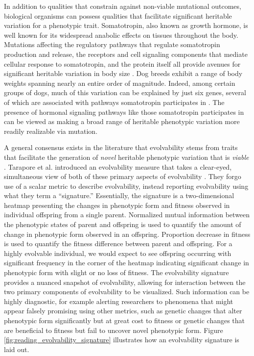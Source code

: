 In addition to qualities that constrain against non-viable mutational outcomes, biological organisms can possess qualities that facilitate significant heritable variation for a phenotypic trait.
Somatotropin, also known as growth hormone, is well known for its widespread anabolic effects on tissues throughout the body.
Mutations affecting the regulatory pathways that regulate somatotropin production and release, the receptors and cell signaling components that mediate cellular response to somatotropin, and the protein itself all provide avenues for significant heritable variation in body size \cite{devesa2016multiple}.
Dog breeds exhibit a range of body weights spanning nearly an entire order of magnitude.
Indeed, among certain groups of dogs, much of this variation can be explained by just six genes, several of which are associated with pathways somatotropin participates in \cite{rimbault2013derived}.
The presence of hormonal signaling pathways like those somatotropin participates in can be viewed as making a broad range of heritable phenotypic variation more readily realizable via mutation.

A general consensus exists in the literature that evolvability stems from traits that facilitate the generation of \textit{novel} heritable phenotypic variation that is \textit{viable} \cite{tarapore2015evolvability}.
Tarapore et al. introduced an evolvability measure that takes a clear-eyed, simultaneous view of both of these primary aspects of evolvability \cite{tarapore2015evolvability}.
They forgo use of a scalar metric to describe evolvability, instead reporting evolvability using what they term a ``signature.''
Essentially, the signature is a two-dimensional heatmap presenting the changes in phenotypic form and fitness observed in individual offspring from a single parent.
Normalized mutual information between the phenotypic states of parent and offspring is used to quantify the amount of change in phenotypic form observed in an offspring.
Proportion decrease in fitness is used to quantify the fitness difference between parent and offspring.
For a highly evolvable individual, we would expect to see offspring occurring with significant frequency in the corner of the heatmap indicating significant change in phenotypic form with slight or no loss of fitness.
The evolvability signature provides a nuanced snapshot of evolvability, allowing for interaction between the two primary components of evolvability to be visualized.
Such information can be highly diagnostic, for example alerting researchers to phenomena that might appear falsely promising using other metrics, such as genetic changes that alter phenotypic form significantly but at great cost to fitness or genetic changes that are beneficial to fitness but fail to uncover novel phenotypic form.
Figure \ref{fig:reading_evolvability_signature} illustrates how an evolvability signature is laid out.

